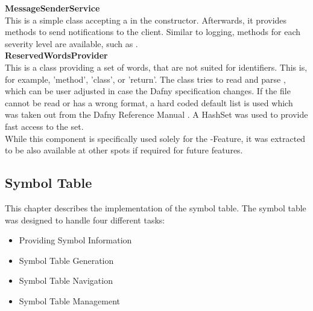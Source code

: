 \textbf{MessageSenderService}\\
This is a simple class accepting a  in the constructor.
Afterwards, it provides methods to send notifications to the client.
Similar to logging, methods for each severity level are available, such as .\\

\textbf{ReservedWordsProvider}\\
This is a class providing a set of words, that are not suited for identifiers.
This is, for example, 'method', 'class', or 'return'.
The class tries to read and parse , which can be user adjusted in case the Dafny specification changes.
If the file cannot be read or has a wrong format, a hard coded default list is used which was taken out from the Dafny Reference Manual \cite{dafnyReferenceManual}.
A HashSet was used to provide fast access to the set.\\

While this component is specifically used solely for the -Feature, it was extracted to be also available at other spots if required for future features.










\subsection{Symbol Table}
This chapter describes the implementation of the symbol table.
The symbol table was designed to handle four different tasks:

\begin{itemize}
    \item Providing Symbol Information
    \item Symbol Table Generation
    \item Symbol Table Navigation
    \item Symbol Table Management
\end{itemize}

